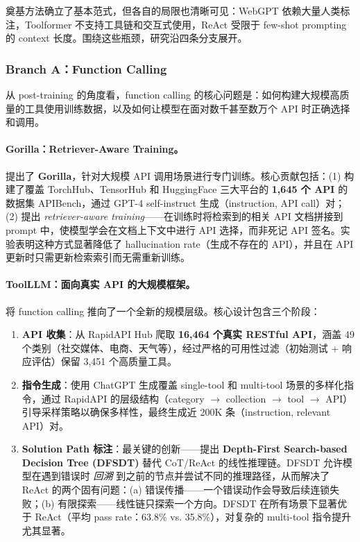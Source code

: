 奠基方法确立了基本范式，但各自的局限也清晰可见：WebGPT 依赖大量人类标注，Toolformer 不支持工具链和交互式使用，ReAct 受限于 few-shot prompting 的 context 长度。围绕这些瓶颈，研究沿四条分支展开。

\subsubsection{Branch A：Function Calling}

从 post-training 的角度看，function calling 的核心问题是：如何构建大规模高质量的工具使用训练数据，以及如何让模型在面对数千甚至数万个 API 时正确选择和调用。

\paragraph{Gorilla：Retriever-Aware Training。}
\citet{patil2023gorilla} 提出了 \textbf{Gorilla}，针对大规模 API 调用场景进行专门训练。核心贡献包括：(1) 构建了覆盖 TorchHub、TensorHub 和 HuggingFace 三大平台的 \textbf{1,645 个 API} 的数据集 APIBench，通过 GPT-4 self-instruct 生成（instruction, API call）对；(2) 提出 \emph{retriever-aware training}——在训练时将检索到的相关 API 文档拼接到 prompt 中，使模型学会在文档上下文中进行 API 选择，而非死记 API 签名。实验表明这种方式显著降低了 hallucination rate（生成不存在的 API），并且在 API 更新时只需更新检索索引而无需重新训练。

\paragraph{ToolLLM：面向真实 API 的大规模框架。}
 将 function calling 推向了一个全新的规模层级。核心设计包含三个阶段：

\begin{enumerate}[leftmargin=*]
  \item \textbf{API 收集}：从 RapidAPI Hub 爬取 \textbf{16,464 个真实 RESTful API}，涵盖 49 个类别（社交媒体、电商、天气等），经过严格的可用性过滤（初始测试 + 响应评估）保留 3,451 个高质量工具。
  \item \textbf{指令生成}：使用 ChatGPT 生成覆盖 single-tool 和 multi-tool 场景的多样化指令，通过 RapidAPI 的层级结构（category $\rightarrow$ collection $\rightarrow$ tool $\rightarrow$ API）引导采样策略以确保多样性，最终生成近 200K 条（instruction, relevant API）对。
  \item \textbf{Solution Path 标注}：最关键的创新——提出 \textbf{Depth-First Search-based Decision Tree (DFSDT)} 替代 CoT/ReAct 的线性推理链。DFSDT 允许模型在遇到错误时 \emph{回溯} 到之前的节点并尝试不同的推理路径，从而解决了 ReAct 的两个固有问题：(a) 错误传播——一个错误动作会导致后续连锁失败；(b) 有限探索——线性链只探索一个方向。DFSDT 在所有场景下显著优于 ReAct（平均 pass rate：63.8\% vs. 35.8\%），对复杂的 multi-tool 指令提升尤其显著。
\end{enumerate}

